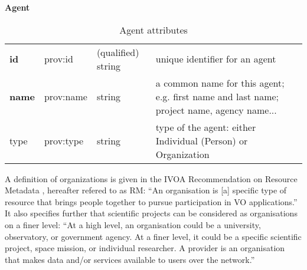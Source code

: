 \begin{table}[h]
\small
{}\textwidth
\textbf{\normalsize Agent}\vspace{0.25em}\\
\begin{tabulary}{1.0\textwidth}{@{}llp{2cm}L@{}}
\toprule
{} &  &  & \\
\midrule
\textbf{id} & prov:id & (qualified) string & unique identifier for an agent\\
\textbf{name} & prov:name & string & a common name for this agent; e.g. first name and last name; project name, agency name...\\
type & prov:type & string & type of the agent: either Individual (Person) or Organization\\
\bottomrule
\end{tabulary}
\caption[Agent attributes]{Agent attributes}
\label{tab:agent-attributes}
\end{table}



A definition of organizations is given in the 
IVOA Recommendation on Resource Metadata \citep{std:ResourceMeta}, hereafter 
refered to as RM: ``An organisation is [a] specific type of resource that 
brings people together to pursue participation in VO applications.''
It also specifies further that scientific projects can be considered 
as organisations on a finer level:
``At a high level, an organisation could be a university, observatory, or government
agency. At a finer level, it could be a specific scientific project, space mission,
or individual researcher. A provider is an organisation that makes data and/or services
available to users over the network.''



